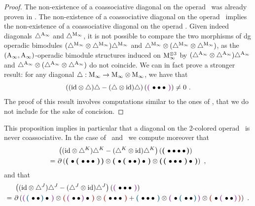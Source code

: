 \documentclass[twoside, 11pt]{amsart}
\theoremstyle{remark}
\begin{document}
\begin{proof}
The non-existence of a coassociative diagonal on the operad \Ainf\ was already proven in \cite[Section 6]{MarklShnider06}.
The non-existence of a coassociative diagonal on the operad \Ainf\ implies the non-existence of a coassociative diagonal on the operad \Minf . 
Given indeed diagonals $\triangle^{\mathrm{A}_\infty}$ and $\triangle^{\mathrm{M}_\infty}$, it is not possible to compare the two morphisms of dg operadic bimodules $ ( \triangle^{\mathrm{M}_\infty} \otimes \triangle^{\mathrm{M}_\infty} ) \triangle^{\mathrm{M}_\infty}$ and $\triangle^{\mathrm{M}_\infty} \otimes (\triangle^{\mathrm{M}_\infty} \otimes \triangle^{\mathrm{M}_\infty} )$, as the $(\mathrm{A}_\infty , \mathrm{A}_\infty)$-operadic bimodule structures induced on $\mathrm{M}_\infty^{\otimes 3}$ by $ ( \triangle^{\mathrm{A}_\infty} \otimes \triangle^{\mathrm{A}_\infty} ) \triangle^{\mathrm{A}_\infty}$ and $\triangle^{\mathrm{A}_\infty} \otimes (\triangle^{\mathrm{A}_\infty} \otimes \triangle^{\mathrm{A}_\infty} )$ do not coincide.
We can in fact prove a stronger result:  for any diagonal $\triangle : \mathrm{M}_\infty \to \mathrm{M}_\infty \otimes \mathrm{M}_\infty$, we have that
\[ \left( (\ide \otimes \triangle ) \triangle - (\triangle \otimes \ide) \triangle \right) \left( \purple{\bullet \bullet \bullet} \right) \neq 0 \ . \]
The proof of this result involves computations similar to the ones of \cite[Section 6]{MarklShnider06}, that we do not include for the sake of concision. 
\end{proof}

\noindent This proposition implies in particular that a diagonal on the 2-colored operad \Ainfdeux\ is never coassociative.
In the case of \diagainf\ and \diagminf\ we compute moreover that
  \begin{align*}
      &\left( (\mathrm{id} \otimes \triangle^{K} ) \triangle^{K} - (\triangle^{K} \otimes \mathrm{id}) \triangle^{K} \right) \left( \boldsymbol{\left(\right.}  \bullet \bullet \bullet \bullet  \boldsymbol{\left.\right)} \right)  \\
      = \  &\partial \left( \boldsymbol{\left(\right.}  \bullet \boldsymbol{\left(\right.}  \bullet \bullet \bullet  \boldsymbol{\left.\right)}  \boldsymbol{\left.\right)} \otimes \boldsymbol{\left(\right.}  \bullet \boldsymbol{\left(\right.}  \bullet \bullet  \boldsymbol{\left.\right)} \bullet  \boldsymbol{\left.\right)} \otimes \boldsymbol{\left(\right.}  \boldsymbol{\left(\right.}  \bullet \bullet \bullet  \boldsymbol{\left.\right)} \bullet  \boldsymbol{\left.\right)}  \right) \ ,
  \end{align*}
and that 
\begin{align*}
      &\left( (\ide \otimes \diagminf ) \diagminf - (\diagminf \otimes \ide) \diagminf \right) \left( \purple{\bullet \bullet \bullet} \right)  \\
      = \ &\partial \left(
  \purple{\blue{\bullet \bullet} \bullet} \otimes \red{\purple{\bullet \bullet} \bullet} \otimes \red{\bullet \bullet \bullet}
  + \blue{\bullet \bullet \bullet} \otimes \purple{ \bullet \blue{\bullet \bullet}} \otimes \red{\bullet \purple{\bullet \bullet}}
  \right) \ .
\end{align*} 
  
\end{document}
